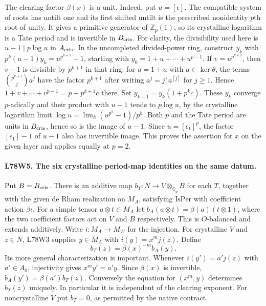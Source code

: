 The clearing factor $\beta(x)$ is a unit. Indeed, put $u=[\epsilon]$.
The compatible system of roots has untilt one and its first shifted
untilt is the prescribed nonidentity $p$th root of unity. It gives a
primitive generator of $\mathbb Z_p(1)$, so its crystalline logarithm
is a Tate period and is invertible in $B_{\rm cris}$. For clarity,
the divisibility used here is $u-1\mid p\log u$ in $A_{\rm cris}$.
In the uncompleted divided-power ring, construct $y_k$ with
$p^k(u-1)y_k=u^{p^{k+1}}-1$, starting with
$y_0=1+u+\cdots+u^{p-1}$. If $v=u^{p^{k+1}}$, then
$v-1$ is divisible by $p^{k+1}$ in that ring: for
$u=1+a$ with $a\in\ker\theta$, the terms
$\binom{p^{k+1}}j a^j$ have the factor $p^{k+1}$ after writing
$a^j=j!\,a^{[j]}$ for $j\ge1$.
Hence $1+v+\cdots+v^{p-1}=p+p^{k+1}c$ there.
Set $y_{k+1}=y_k(1+p^kc)$. These $y_k$ converge $p$-adically
and their product with $u-1$ tends to $p\log u$, by the crystalline
logarithm limit $\log u=\lim_h(u^{p^h}-1)/p^h$.
Both $p$ and the Tate period are units in $B_{\rm cris}$, hence so
is the image of $u-1$. Since $u=[\epsilon_1]^p$, the factor
$[\epsilon_1]-1$ of $u-1$ also has invertible image. This proves
the assertion for $x$ on the given layer and applies equally at $p=2$.

\paragraph{L78W5. The six crystalline period-map identities on the same datum.}
Put $B=B_{\rm cris}$. There is an additive map
$b_T:N\to V\otimes_{\mathbb Q_p} B$ for each $T$, together
with the given de Rham realization on $M_A$, satisfying
$\mathrm{IsPer}$ with coefficient action $\beta\iota$.
For a simple tensor $a\otimes t\in M_A$ let
$b_A(a\otimes t)=\beta(a)(t\otimes1)$, where the two coefficient
factors act on $V$ and $B$ respectively. This is $O$-balanced and
extends additively. Write $i:M_A\to M_W$ for the injection.
For crystalline $V$ and $z\in N$, L78W3 supplies $y\in M_A$ with
$i(y)=x^m j(z)$. Define
\[
                    b_T(z)=\beta(x)^{-m} b_A(y).
\]
Its more general characterization is important. Whenever
$i(y')=a'j(z)$ with $a'\in A_0$, injectivity gives
$x^m y'=a'y$. Since $\beta(x)$ is invertible,
$b_A(y')=\beta(a')b_T(z)$. Conversely the equation for
$(x^m,y)$ determines $b_T(z)$ uniquely. In particular it is
independent of the clearing exponent. For noncrystalline $V$ put
$b_T=0$, as permitted by the native contract.

